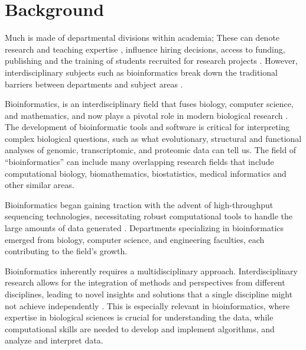 \documentclass[fleqn,10pt,doc,onecolumn]{SelfArx}%
\affiliation{\textsuperscript{1}\textit{Department of Biochemistry, University of Otago, Dunedin, New Zealand.}} %
\affiliation{*\textbf{Corresponding author}: paul.gardner@otago.ac.nz} %
\begin{document}
\flushbottom %
\maketitle %

\thispagestyle{empty} %


\section*{Background}


Much is made of departmental divisions within academia; These can
denote research and teaching expertise \cite{ben2016s}, influence
hiring decisions, access to funding, publishing and the training of
students recruited for research projects
\cite{bourke1998institutions}. However, interdisciplinary subjects
such as bioinformatics break down the traditional barriers between
departments and subject areas
\cite{Ouzounis:2003,Eddy:2005,hogeweg2011roots}.

Bioinformatics, is an interdisciplinary field that fuses biology,
computer science, and mathematics, and now plays a pivotal role in
modern biological research \cite{Ouzounis:2003}. The development of
bioinformatic tools and software is critical for interpreting complex
biological questions, such as what evolutionary, structural and
functional analyses of genomic, transcriptomic, and proteomic data can
tell us. The field of ``bioinformatics'' can include many overlapping
research fields that include computational biology, biomathematics,
biostatistics, medical informatics and other similar areas.

Bioinformatics began gaining traction with the advent of
high-throughput sequencing technologies, necessitating robust
computational tools to handle the large amounts of data generated
\cite{Ouzounis:2003,hogeweg2011roots}. Departments specializing in
bioinformatics emerged from biology, computer science, and engineering
faculties, each contributing to the field's growth.

Bioinformatics inherently requires a multidisciplinary
approach. Interdisciplinary research allows for the integration of
methods and perspectives from different disciplines, leading to novel
insights and solutions that a single discipline might not achieve
independently \cite{mazzocchi2019scientific}.  This is especially
relevant in bioinformatics, where expertise in biological sciences is
crucial for understanding the data, while computational skills are
needed to develop and implement algorithms, and analyze and interpret
data.
\end{document}
